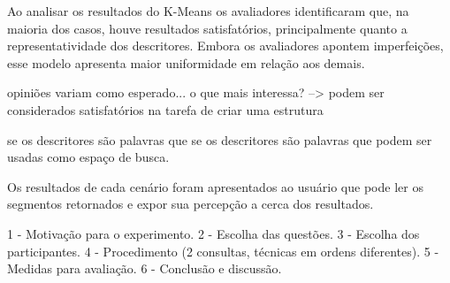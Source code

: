 
Ao analisar os resultados do K-Means os avaliadores identificaram que, na maioria dos casos, houve resultados satisfatórios, principalmente quanto a representatividade dos descritores. Embora os avaliadores apontem imperfeições, esse modelo apresenta maior uniformidade em relação aos demais.





opiniões variam como esperado...
o que mais interessa?
--> podem ser considerados satisfatórios na tarefa de criar uma estrutura 

se os descritores são palavras que 
se os descritores são palavras que podem ser usadas como espaço de busca.







Os resultados de cada cenário foram apresentados ao usuário que pode ler os segmentos retornados e expor sua percepção a cerca dos resultados.


 1 - Motivação para o experimento.
 2 - Escolha das questões.
 3 - Escolha dos participantes.
 4 - Procedimento (2 consultas, técnicas em ordens diferentes).
 5 - Medidas para avaliação.
 6 - Conclusão e discussão.


